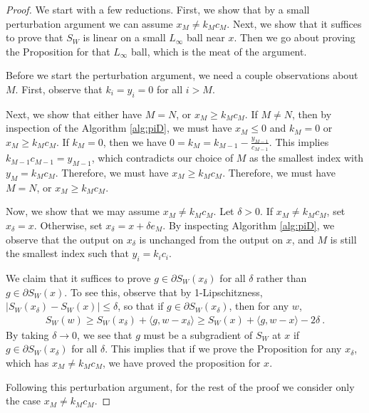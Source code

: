 \documentclass[12pt]{colt2018} %
\begin{document}
\begin{proof}
We start with a few reductions. First, we show that by a small perturbation argument we can assume $x_M\ne k_Mc_M$. Next, we show that it suffices to prove that $S_W$ is linear on a small $L_\infty$ ball near $x$. Then we go about proving the Proposition for that $L_\infty$ ball, which is the meat of the argument.

Before we start the perturbation argument, we need a couple observations about $M$. First, observe that $k_i=y_i=0$ for all $i>M$.

Next, we show that either have $M=N$, or $x_M\ge k_Mc_M$. If $M\ne N$, then by inspection of the Algorithm \ref{alg:piD}, we must have $x_M\le 0$ and $k_M=0$ or $x_M\ge k_Mc_M$. If $k_M=0$, then we have $0=k_{M} = k_{M-1}-\frac{y_{M-1}}{c_{M-1}}$. This implies $k_{M-1}c_{M-1}=y_{M-1}$, which contradicts our choice of $M$ as the smallest index with $y_M=k_Mc_M$. Therefore, we must have $x_M\ge k_Mc_M$. Therefore, we must have $M=N$, or $x_M\ge k_Mc_M$.


Now, we show that we may assume $x_M\ne k_Mc_M$. Let $\delta>0$. If $x_M\ne k_Mc_M$, set $x_\delta=x$. Otherwise, set $x_\delta=x+\delta e_M$. By inspecting Algorithm \ref{alg:piD}, we observe that the output on $x_\delta$ is unchanged from the output on $x$, and $M$ is still the smallest index such that $y_i=k_ic_i$.

We claim that it suffices to prove $g\in \partial S_W(x_\delta)$ for all $\delta$ rather than $g\in \partial S_W(x)$. To see this, observe that by 1-Lipschitzness, $|S_W(x_\delta)-S_W(x)|\le \delta$, so that if $g\in\partial S_W(x_\delta)$, then for any $w$,
\begin{align*}
    S_W(w)\ge S_W(x_\delta)+\langle g,w-x_\delta\rangle \ge S_W(x) + \langle g, w-x\rangle - 2\delta~.
\end{align*}
By taking $\delta\to 0$, we see that $g$ must be a subgradient of $S_W$ at $x$ if $g\in \partial S_W(x_\delta)$ for all $\delta$. This implies that if we prove the Proposition for any $x_\delta$, which has $x_M\ne k_Mc_M$, we have proved the proposition for $x$.

Following this perturbation argument, for the rest of the proof we consider only the case $x_M\ne k_Mc_M$.


\end{proof}
\end{document}
